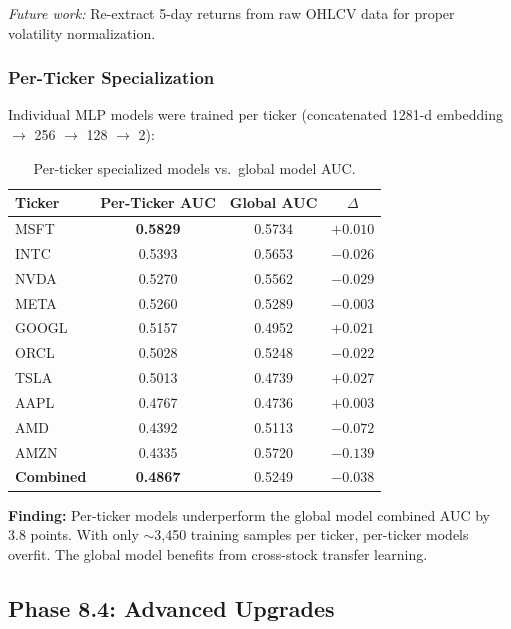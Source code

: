 \documentclass[12pt,a4paper]{article}
\begin{document}
\textit{Future work:} Re-extract 5-day returns from raw OHLCV data for proper volatility normalization.

\subsubsection{Per-Ticker Specialization}

Individual MLP models were trained per ticker (concatenated 1281-d embedding $\rightarrow$ 256 $\rightarrow$ 128 $\rightarrow$ 2):

\begin{table}[H]
\centering
\caption{Per-ticker specialized models vs.\ global model AUC.}
\begin{tabular}{lccc}
\toprule
\textbf{Ticker} & \textbf{Per-Ticker AUC} & \textbf{Global AUC} & \textbf{$\Delta$} \\
\midrule
MSFT  & \textbf{0.5829} & 0.5734 & $+0.010$ \\
INTC  & 0.5393 & 0.5653 & $-0.026$ \\
NVDA  & 0.5270 & 0.5562 & $-0.029$ \\
META  & 0.5260 & 0.5289 & $-0.003$ \\
GOOGL & 0.5157 & 0.4952 & $+0.021$ \\
ORCL  & 0.5028 & 0.5248 & $-0.022$ \\
TSLA  & 0.5013 & 0.4739 & $+0.027$ \\
AAPL  & 0.4767 & 0.4736 & $+0.003$ \\
AMD   & 0.4392 & 0.5113 & $-0.072$ \\
AMZN  & 0.4335 & 0.5720 & $-0.139$ \\
\midrule
\textbf{Combined} & \textbf{0.4867} & 0.5249 & $-0.038$ \\
\bottomrule
\end{tabular}
\end{table}

\textbf{Finding:} Per-ticker models underperform the global model combined AUC by 3.8 points. With only $\sim$3,450 training samples per ticker, per-ticker models overfit. The global model benefits from cross-stock transfer learning.

\subsection{Phase 8.4: Advanced Upgrades}
\label{sec:v2phase4}
\end{document}
